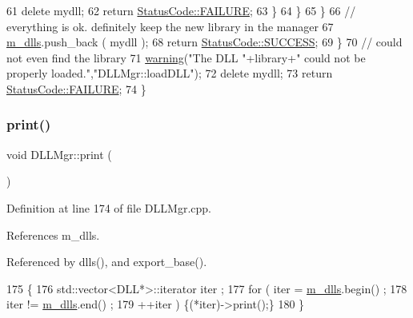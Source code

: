 \begin{DoxyCode}
61           \textcolor{keyword}{delete} mydll;
62           \textcolor{keywordflow}{return} \hyperlink{classStatusCode_a6f565cbeadc76d14c72f047e5e85eb4ba3da73d4c469762eb9d3c960368252b26}{StatusCode::FAILURE};
63         \}
64       \}
65     \}
66      \textcolor{comment}{// everything is ok. definitely keep the new library in the manager     }
67      \hyperlink{classDLLMgr_a5bd713edea21d64f32aa71162bca581a}{m\_dlls}.push\_back ( mydll );
68      \textcolor{keywordflow}{return} \hyperlink{classStatusCode_a6f565cbeadc76d14c72f047e5e85eb4badd0da38d3ba0d922efd1f4619bc37ad8}{StatusCode::SUCCESS};
69    \}
70    \textcolor{comment}{// could not even find the library}
71    \hyperlink{classDLLMgr_ad8a177de233cda457b5566e4ff3bb50e}{warning}(\textcolor{stringliteral}{"The DLL "}+library+\textcolor{stringliteral}{" could not be properly loaded."},\textcolor{stringliteral}{"DLLMgr::loadDLL"});
72    \textcolor{keyword}{delete} mydll;
73    \textcolor{keywordflow}{return} \hyperlink{classStatusCode_a6f565cbeadc76d14c72f047e5e85eb4ba3da73d4c469762eb9d3c960368252b26}{StatusCode::FAILURE};
74 \}
\end{DoxyCode}
\mbox{\label{classDLLMgr_a223c039ca2d098fd825d52b22a9feeb4}} 
\subsubsection{\texorpdfstring{print()}{print()}}
{\footnotesize\ttfamily void D\+L\+L\+Mgr\+::print (\begin{DoxyParamCaption}{ }\end{DoxyParamCaption})}



Definition at line 174 of file D\+L\+L\+Mgr.\+cpp.



References m\+\_\+dlls.



Referenced by dlls(), and export\+\_\+base().


\begin{DoxyCode}
175 \{
176   std::vector<DLL*>::iterator iter ;
177   \textcolor{keywordflow}{for} ( iter = \hyperlink{classDLLMgr_a5bd713edea21d64f32aa71162bca581a}{m\_dlls}.begin() ; 
178         iter != \hyperlink{classDLLMgr_a5bd713edea21d64f32aa71162bca581a}{m\_dlls}.end()  ; 
179         ++iter ) \{(*iter)->print();\}
180 \}
\end{DoxyCode}
\mbox{\label{classDLLMgr_a0e4b881509f638f94cb4d6612578157b}} 

